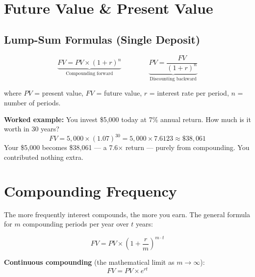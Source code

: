 \documentclass[11pt, letterpaper]{article}
\begin{document}
\section*{Future Value \& Present Value}

\subsection*{Lump-Sum Formulas (Single Deposit)}

\[
  \underbrace{FV = PV \times (1 + r)^n}_{\text{Compounding forward}}
  \qquad\qquad
  \underbrace{PV = \frac{FV}{(1 + r)^n}}_{\text{Discounting backward}}
\]

where $PV$ = present value, $FV$ = future value, $r$ = interest rate per period, $n$ = number of periods.

\begin{tcolorbox}[colback=part2bg, colframe=sectiongreen, arc=3pt, boxrule=1pt]
\textbf{Worked example:} You invest \$5{,}000 today at 7\% annual return. How much is it worth in 30 years?
\[
  FV = 5{,}000 \times (1.07)^{30} = 5{,}000 \times 7.6123 \approx \$38{,}061
\]
Your \$5{,}000 becomes \$38{,}061 --- a 7.6$\times$ return --- purely from compounding. You contributed nothing extra.
\end{tcolorbox}

\section*{Compounding Frequency}

The more frequently interest compounds, the more you earn. The general formula for $m$ compounding periods per year over $t$ years:

\[
  FV = PV \times \left(1 + \frac{r}{m}\right)^{m \cdot t}
\]

\textbf{Continuous compounding} (the mathematical limit as $m \to \infty$):
\[
  FV = PV \times e^{rt}
\]
\end{document}

